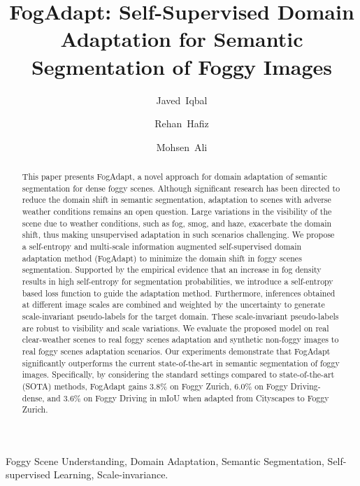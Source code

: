 \documentclass[final,5p,times,twocolumn]{elsarticle}
\begin{document}
\begin{frontmatter}

\title{FogAdapt: Self-Supervised Domain Adaptation for Semantic Segmentation of Foggy Images}

\author{Javed~Iqbal}

\author{Rehan~Hafiz}

\author{Mohsen~Ali}


\address{Information Technology University, Pakistan}







\begin{abstract}

This paper presents FogAdapt, a novel approach for domain adaptation of semantic segmentation for dense foggy scenes. Although significant research has been directed to reduce the domain shift in semantic segmentation, adaptation to scenes with adverse weather conditions remains an open question. Large variations in the visibility of the scene due to weather conditions, such as fog, smog, and haze, exacerbate the domain shift, thus making unsupervised adaptation in such scenarios challenging. We propose a self-entropy and multi-scale information augmented self-supervised domain adaptation method (FogAdapt) to minimize the domain shift in foggy scenes segmentation. Supported by the empirical evidence that an increase in fog density results in high self-entropy for segmentation probabilities, we introduce a self-entropy based loss function to guide the adaptation method. Furthermore, inferences obtained at different image scales are combined and weighted by the uncertainty to generate scale-invariant pseudo-labels for the target domain. These scale-invariant pseudo-labels are robust to visibility and scale variations. We evaluate the proposed model on real clear-weather scenes to real foggy scenes adaptation and synthetic non-foggy images to real foggy scenes adaptation scenarios. Our experiments demonstrate that FogAdapt significantly outperforms the current state-of-the-art in semantic segmentation of foggy images. Specifically, by considering the standard settings compared to state-of-the-art (SOTA) methods, FogAdapt gains 3.8\% on Foggy Zurich, 6.0\% on Foggy Driving-dense, and 3.6\% on Foggy Driving in mIoU when adapted from Cityscapes to Foggy Zurich.





\end{abstract}


\begin{keyword}
Foggy Scene Understanding, Domain Adaptation, Semantic Segmentation, Self-supervised Learning, Scale-invariance.
\end{keyword}

\end{frontmatter}
\end{document}
